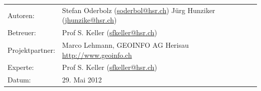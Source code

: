 \begin{titlepage}
\begin{flushleft}
\begin{longtable}{lp{10cm}}
Autoren: & Stefan Oderbolz (\url{soderbol@hsr.ch}) \newline
 Jürg Hunziker (\url{jhunzike@hsr.ch}) \\ 
Betreuer: & Prof S. Keller (\url{sfkeller@hsr.ch}) \\ 
Projektpartner: & Marco Lehmann, GEOINFO AG Herisau \url{http://www.geoinfo.ch} \\ 
Experte: & Prof S. Keller (\url{sfkeller@hsr.ch}) \\ 
Datum: & 29. Mai 2012 \\ 
\end{longtable}

\end{flushleft}
\end{titlepage}
